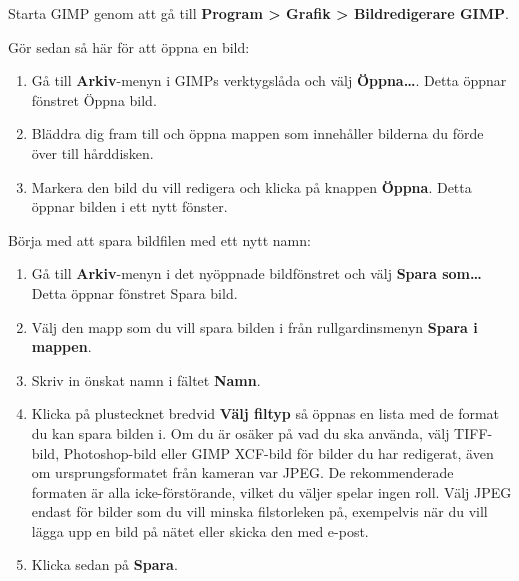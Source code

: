 \documentclass[a4paper,final]{memoir} %
\begin{document}
Starta GIMP genom att gå till \textbf{Program \textgreater{} Grafik \textgreater{} Bildredigerare GIMP}.

Gör sedan så här för att öppna en bild:

\begin{enumerate}
	
\item Gå till \textbf{Arkiv}-menyn i GIMPs verktygslåda och välj \textbf{Öppna\ldots{}}. Detta öppnar fönstret Öppna bild.
\item Bläddra dig fram till och öppna mappen som innehåller bilderna du förde över till hårddisken.
\item Markera den bild du vill redigera och klicka på knappen \textbf{Öppna}. Detta öppnar bilden i ett nytt fönster.
 
\end{enumerate}

Börja med att spara bildfilen med ett nytt namn:

\begin{enumerate}
	
\item Gå till \textbf{Arkiv}-menyn i det nyöppnade bildfönstret och välj \textbf{Spara som\ldots{}} Detta öppnar fönstret Spara bild.


\item Välj den mapp som du vill spara bilden i från rullgardinsmenyn \textbf{Spara i mappen}.

\item Skriv in önskat namn i fältet \textbf{Namn}.

\item Klicka på plustecknet bredvid \textbf{Välj filtyp} så öppnas en lista med de format du kan spara bilden i. Om du är osäker på vad du ska använda, välj TIFF-bild, Photoshop-bild eller GIMP XCF-bild för bilder du har redigerat, även om ursprungsformatet från kameran var JPEG. De rekommenderade formaten är alla icke-förstörande, vilket du väljer spelar ingen roll. Välj JPEG endast för bilder som du vill minska filstorleken på, exempelvis när du vill lägga upp en bild på nätet eller skicka den med e-post.

\item Klicka sedan på \textbf{Spara}.

\end{enumerate}
\end{document}
